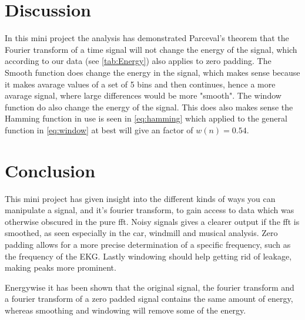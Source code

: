 \section{Discussion}

In this mini project the analysis has demonstrated Parceval's theorem that the Fourier transform of a time signal will not change the energy of the signal, which according to our data (see \cref{tab:Energy}) also applies to zero padding. The Smooth function does change the energy in the signal, which makes sense because it makes avarage values of a set of 5 bins and then continues, hence a more avarage signal, where large differences would be more "smooth". The window function do also change the energy of the signal. This does also makes sense the Hamming function in use is seen in \cref{eq:hamming} which applied to the general function in \cref{eq:window} at best will give an factor of $w(n)=0.54$.

\section{Conclusion}

This mini project has given insight into the different kinds of ways you can manipulate a signal, and it's fourier transform, to gain access to data which was otherwise obscured in the pure fft. Noisy signals gives a clearer output if the fft is smoothed, as seen especially in the car, windmill and musical analysis. Zero padding allows for a more precise determination of a specific frequency, such as the frequency of the EKG. Lastly windowing should help getting rid of leakage, making peaks more prominent.

Energywise it has been shown that the original signal, the fourier transform and a fourier transform of a zero padded signal contains the same amount of energy, whereas smoothing and windowing will remove some of the energy.